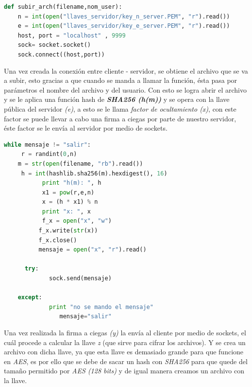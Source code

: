 \begin{lstlisting}[language=Python,frame=single, keywordstyle=\color{blue},breaklines=true]
def subir_arch(filename,nom_user):
    n = int(open("llaves_servidor/key_n_server.PEM", "r").read())
    e = int(open("llaves_servidor/key_e_server.PEM", "r").read())
    host, port = "localhost" , 9999
    sock= socket.socket()
    sock.connect((host,port))
\end{lstlisting}


Una vez creada la conexión  entre cliente - servidor, se obtiene el archivo que se va a subir, esto gracias a que cuando se manda a llamar la función, ésta pasa por parámetros el nombre del archivo y del usuario. Con esto se logra abrir el archivo y se le aplica una función hash de \textbf{\textit{SHA256 (h(m))}} y se opera con la llave pública del servidor \textit{(e)}, a esto se le llama \textit{factor de ocultamiento (x)}, con este factor se puede llevar a cabo una firma a ciegas por parte de nuestro servidor, éste factor se le envía al servidor por medio de  sockets.

\begin{lstlisting}[language=Python,frame=single, keywordstyle=\color{blue},breaklines=true, showstringspaces=false]
 while mensaje != "salir":
	 r = randint(0,n)
	m = str(open(filename, "rb").read())
	 h = int(hashlib.sha256(m).hexdigest(), 16)
           print "h(m): ", h
           x1 = pow(r,e,n)
           x = (h * x1) % n
           print "x: ", x
           f_x = open("x", "w")
          f_x.write(str(x))
          f_x.close()
          mensaje = open("x", "r").read() 

	  try:
           	 sock.send(mensaje)

	except:
           	 print "no se mando el mensaje"
            	mensaje="salir"
\end{lstlisting}

Una vez realizada la firma a ciegas \textit{(y)} la envía al cliente por medio de sockets, el cuál procede a calcular la llave \textit{z} (que sirve para cifrar los archivos). Y se crea un archivo con dicha llave, ya que esta llave es demasiado grande para que funcione en \textit{AES}, es por ello que se debe de sacar un hash con \textit{SHA256} para que quede del tamaño permitido por \textit{AES (128 bits)} y de igual manera creamos un archivo con la llave.

